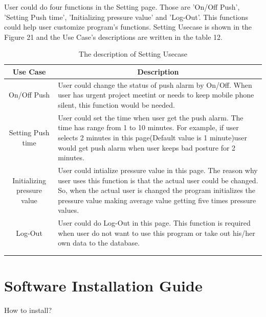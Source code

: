\documentclass[conference]{IEEEtran}
\begin{document}
 User could do four functions in the Setting page. Those are 'On/Off Push', 'Setting Push time', 'Initializing pressure value' and 'Log-Out'. This functions could help user customize program's functions. Setting Usecase is shown in the Figure 21 and the Use Case's descriptions are written in the table 12.

\begin{table}[h]
{\renewcommand\arraystretch{1.25}
\caption{The description of Setting Usecase}
\begin{tabular}{|c|l|l|} \hline
Use Case & \multicolumn{2}{c|}{Description} \\ \hline\hline
On/Off Push & \multicolumn{2}{p{5cm}|}{\raggedright User could change the status of push alarm by On/Off. When user has urgent project meetint or needs to keep mobile phone silent, this function would be needed.} \\ \hline
Setting Push time & \multicolumn{2}{p{5cm}|}{\raggedright User could set the time when user get the push alarm. The time has range from 1 to 10 minutes. For example, if user selects 2 minutes in this page(Default value is 1 minute)user would get push alarm when user keeps bad posture for 2 minutes.  } \\ \hline
Initializing pressure value & \multicolumn{2}{p{5cm}|}{\raggedright User could intialize pressure value in this page. The reason why user uses this function is that the actual user could be changed. So, when the actual user is changed the program initializes the pressure value making average value getting five times pressure values. } \\ \hline
Log-Out & \multicolumn{2}{p{5cm}|}{\raggedright User could do Log-Out in this page. This function is required when user do not want to use this program or take out his/her own data to the database. } \\\\\\ \hline
\end{tabular}}
\end{table}


\section{Software Installation Guide}

How to install?
\end{document}
